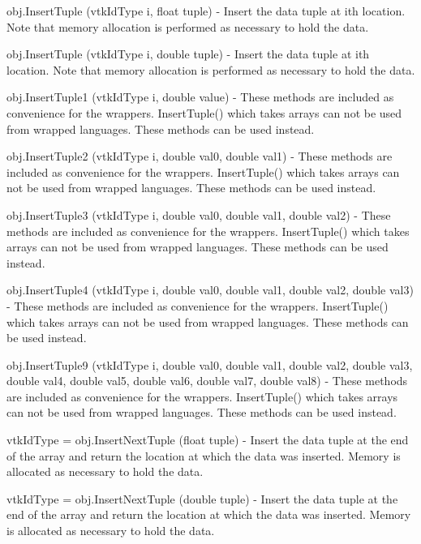 \begin{DoxyItemize}
\item {\ttfamily obj.\-Insert\-Tuple (vtk\-Id\-Type i, float tuple)} -\/ Insert the data tuple at ith location. Note that memory allocation is performed as necessary to hold the data.  
\item {\ttfamily obj.\-Insert\-Tuple (vtk\-Id\-Type i, double tuple)} -\/ Insert the data tuple at ith location. Note that memory allocation is performed as necessary to hold the data.  
\item {\ttfamily obj.\-Insert\-Tuple1 (vtk\-Id\-Type i, double value)} -\/ These methods are included as convenience for the wrappers. Insert\-Tuple() which takes arrays can not be used from wrapped languages. These methods can be used instead.  
\item {\ttfamily obj.\-Insert\-Tuple2 (vtk\-Id\-Type i, double val0, double val1)} -\/ These methods are included as convenience for the wrappers. Insert\-Tuple() which takes arrays can not be used from wrapped languages. These methods can be used instead.  
\item {\ttfamily obj.\-Insert\-Tuple3 (vtk\-Id\-Type i, double val0, double val1, double val2)} -\/ These methods are included as convenience for the wrappers. Insert\-Tuple() which takes arrays can not be used from wrapped languages. These methods can be used instead.  
\item {\ttfamily obj.\-Insert\-Tuple4 (vtk\-Id\-Type i, double val0, double val1, double val2, double val3)} -\/ These methods are included as convenience for the wrappers. Insert\-Tuple() which takes arrays can not be used from wrapped languages. These methods can be used instead.  
\item {\ttfamily obj.\-Insert\-Tuple9 (vtk\-Id\-Type i, double val0, double val1, double val2, double val3, double val4, double val5, double val6, double val7, double val8)} -\/ These methods are included as convenience for the wrappers. Insert\-Tuple() which takes arrays can not be used from wrapped languages. These methods can be used instead.  
\item {\ttfamily vtk\-Id\-Type = obj.\-Insert\-Next\-Tuple (float tuple)} -\/ Insert the data tuple at the end of the array and return the location at which the data was inserted. Memory is allocated as necessary to hold the data.  
\item {\ttfamily vtk\-Id\-Type = obj.\-Insert\-Next\-Tuple (double tuple)} -\/ Insert the data tuple at the end of the array and return the location at which the data was inserted. Memory is allocated as necessary to hold the data.  

\end{DoxyItemize}
